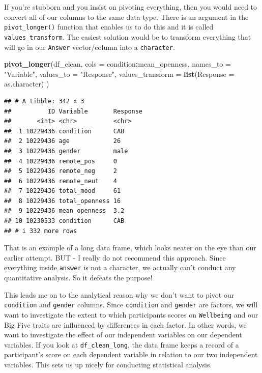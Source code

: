 \documentclass[
]{book}
\newenvironment{Shaded}{\begin{snugshade}}{\end{snugshade}}
\newcommand{\AttributeTok}[1]{\textcolor[rgb]{0.13,0.29,0.53}{#1}}
\newcommand{\FunctionTok}[1]{\textcolor[rgb]{0.13,0.29,0.53}{\textbf{#1}}}
\newcommand{\NormalTok}[1]{#1}
\newcommand{\SpecialCharTok}[1]{\textcolor[rgb]{0.81,0.36,0.00}{\textbf{#1}}}
\newcommand{\StringTok}[1]{\textcolor[rgb]{0.31,0.60,0.02}{#1}}
\begin{document}
If you're stubborn and you insist on pivoting everything, then you would need to convert all of our columns to the same data type. There is an argument in the \texttt{pivot\_longer()} function that enables us to do this and it is called \texttt{values\_transform}. The easiest solution would be to transform everything that will go in our \texttt{Answer} vector/column into a \texttt{character}.

\begin{Shaded}
\begin{Highlighting}[]
\FunctionTok{pivot\_longer}\NormalTok{(df\_clean,}
  \AttributeTok{cols =}\NormalTok{ condition}\SpecialCharTok{:}\NormalTok{mean\_openness, }
  \AttributeTok{names\_to =} \StringTok{"Variable"}\NormalTok{, }
  \AttributeTok{values\_to =} \StringTok{"Response"}\NormalTok{,}
  \AttributeTok{values\_transform =} \FunctionTok{list}\NormalTok{(}\AttributeTok{Response =}\NormalTok{ as.character)}
\NormalTok{  )}
\end{Highlighting}
\end{Shaded}

\begin{verbatim}
## # A tibble: 342 x 3
##          ID Variable       Response
##       <int> <chr>          <chr>   
##  1 10229436 condition      CAB     
##  2 10229436 age            26      
##  3 10229436 gender         male    
##  4 10229436 remote_pos     0       
##  5 10229436 remote_neg     2       
##  6 10229436 remote_neut    4       
##  7 10229436 total_mood     61      
##  8 10229436 total_openness 16      
##  9 10229436 mean_openness  3.2     
## 10 10230533 condition      CAB     
## # i 332 more rows
\end{verbatim}

That is an example of a long data frame, which looks neater on the eye than our earlier attempt. BUT - I really do not recommend this approach. Since everything inside \texttt{answer} is not a character, we actually can't conduct any quantitative analysis. So it defeats the purpose!

This leads me on to the analytical reason why we don't want to pivot our \texttt{condition} and \texttt{gender} columns. Since \texttt{condition} and \texttt{gender} are factors, we will want to investigate the extent to which participants scores on \texttt{Wellbeing} and our Big Five traits are influenced by differences in each factor. In other words, we want to investigate the effect of our independent variables on our dependent variables. If you look at \texttt{df\_clean\_long}, the data frame keeps a record of a participant's score on each dependent variable in relation to our two independent variables. This sets us up nicely for conducting statistical analysis.
\end{document}
